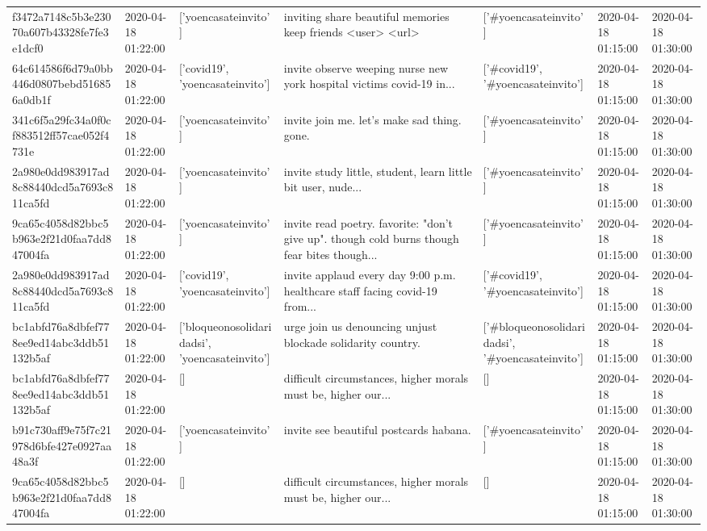 \begin{tabular}{lllllll}
f3472a7148c5b3e23070a607b43328fe7fe3e1dcf0 & 2020-04-18 01:22:00 & ['yoencasateinvito'] & inviting share beautiful memories keep friends <user> <url> & ['#yoencasateinvito'] & 2020-04-18 01:15:00 & 2020-04-18 01:30:00 \\
64c614586f6d79a0bb446d0807bebd516856a0db1f & 2020-04-18 01:22:00 & ['covid19', 'yoencasateinvito'] & invite observe weeping nurse new york hospital victims covid-19 in... & ['#covid19', '#yoencasateinvito'] & 2020-04-18 01:15:00 & 2020-04-18 01:30:00 \\
341c6f5a29fc34a0f0cf883512ff57cae052f4731e & 2020-04-18 01:22:00 & ['yoencasateinvito'] & invite join me. let's make sad thing. gone. & ['#yoencasateinvito'] & 2020-04-18 01:15:00 & 2020-04-18 01:30:00 \\
2a980e0dd983917ad8c88440dcd5a7693c811ca5fd & 2020-04-18 01:22:00 & ['yoencasateinvito'] & invite study little, student, learn little bit user, nude... & ['#yoencasateinvito'] & 2020-04-18 01:15:00 & 2020-04-18 01:30:00 \\
9ca65c4058d82bbc5b963e2f21d0faa7dd847004fa & 2020-04-18 01:22:00 & ['yoencasateinvito'] & invite read poetry. favorite: "don't give up". though cold burns though fear bites though... & ['#yoencasateinvito'] & 2020-04-18 01:15:00 & 2020-04-18 01:30:00 \\
2a980e0dd983917ad8c88440dcd5a7693c811ca5fd & 2020-04-18 01:22:00 & ['covid19', 'yoencasateinvito'] & invite applaud every day 9:00 p.m. healthcare staff facing covid-19 from... & ['#covid19', '#yoencasateinvito'] & 2020-04-18 01:15:00 & 2020-04-18 01:30:00 \\
bc1abfd76a8dbfef778ee9ed14abc3ddb51132b5af & 2020-04-18 01:22:00 & ['bloqueonosolidaridadsi', 'yoencasateinvito'] & urge join us denouncing unjust blockade solidarity country. & ['#bloqueonosolidaridadsi', '#yoencasateinvito'] & 2020-04-18 01:15:00 & 2020-04-18 01:30:00 \\
bc1abfd76a8dbfef778ee9ed14abc3ddb51132b5af & 2020-04-18 01:22:00 & [] & difficult circumstances, higher morals must be, higher our... & [] & 2020-04-18 01:15:00 & 2020-04-18 01:30:00 \\
b91c730aff9e75f7c21978d6bfe427e0927aa48a3f & 2020-04-18 01:22:00 & ['yoencasateinvito'] & invite see beautiful postcards habana. & ['#yoencasateinvito'] & 2020-04-18 01:15:00 & 2020-04-18 01:30:00 \\
9ca65c4058d82bbc5b963e2f21d0faa7dd847004fa & 2020-04-18 01:22:00 & [] & difficult circumstances, higher morals must be, higher our... & [] & 2020-04-18 01:15:00 & 2020-04-18 01:30:00 \\

\end{tabular}
